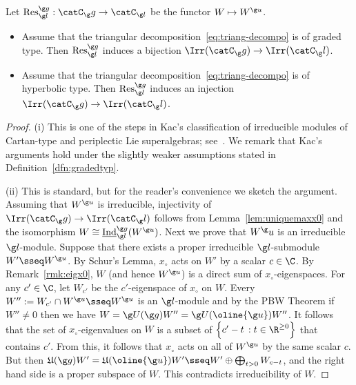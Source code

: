 \documentclass[12pt]{amsart}
\begin{document}
\begin{prp}
\label{prp:Wq+-inv} Let $\mathrm{Res}_{\g l}^{\g g}:\catC_\g g\to \catC_{\g l}$ be the functor $W\mapsto W^{\g u}$. 
\begin{itemize}
\item[\rm (i)] Assume that the triangular decomposition~\eqref{eq:triang-decompo} is of graded type. Then $\mathrm{Res}_{\g l}^{\g g}$ induces a bijection $\Irr(\catC_\g g)\to \Irr(\catC_\g l)$.  

\item[\rm (ii)] Assume that the triangular decomposition~\eqref{eq:triang-decompo}  is of hyperbolic type.
Then $\mathrm{Res}_{\g l}^{\g g}$ induces an injection $\Irr(\catC_\g g)\to \Irr(\catC_\g l)$.  
\end{itemize}
\end{prp}
\begin{proof}
(i) This is one of the steps in Kac's  classification of irreducible modules of Cartan-type and periplectic Lie superalgebras; see~\cite[Prop 5.2.5]{KacAdvances}. We remark that Kac's arguments hold under the slightly weaker assumptions stated in Definition~\ref{dfn:gradedtyp}. 

(ii) 
This is standard, but for the reader's convenience we sketch the argument. 
Assuming that $W^{\g u}$ is irreducible, injectivity of  $\Irr(\catC_\g g)\to\Irr(\catC_\g l)$ follows from Lemma~\ref{lem:uniquemaxx0} and 
the isomorphism $W\cong \underline{\mathrm{Ind}}_{\g l}^{\g g}(W^{\g u})$. 
Next we prove that $W^\g u$ is an irreducible $\g l$-module. 
Suppose that there exists a proper irreducible $\g l$-submodule $W'\sseq W^{\g u}$. By Schur's Lemma, $x_\circ$ acts on $W'$ by a scalar $c\in\C$. By Remark~\ref{rmk:eigx0}, $W$ (and hence $W^{\g u}$) is a direct sum of $x_\circ$-eigenspaces. 
For  any $c'\in\C$, let $W_{c'}$ be the $c'$-eigenspace of $x_\circ$ on $W$.
Every $W'':=W_{c'}\cap W^{\g u}\sseq W^{\g u}$  is an $\g l$-module and by the PBW Theorem if $W''\neq 0$ then  we have 
$W=\g U(\g g)W''=\g U(\oline{\g u})W''$. It follows that the set of $x_\circ$-eigenvalues on $W$ is a subset of $\left\{c'-t\,:t\in\R^{\geq 0}\right\}$ that contains $c'$. From this, it follows that $x_\circ$ acts on all of $W^{\g u}$ by the same scalar $c$. But then $
\mathfrak U(\g g)W'=\mathfrak U(\oline{\g u})W'\sseq W'\oplus\bigoplus_{t>0}W_{c-t}$,
and the right hand side is a proper subspace of $W$. This contradicts irreducibility of $W$. 
 \end{proof}
\end{document}
